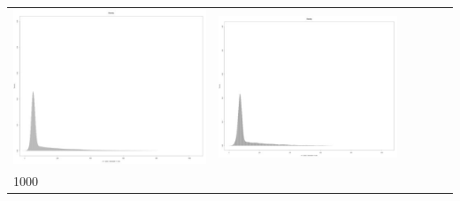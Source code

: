 \begin{table}[htbp]
{\begin{tabular}{l | ccccc}
\begin{minipage}{.15\textwidth}
     			 	\includegraphics[width=\linewidth]{images/mema-dens-graph/N7}
    				 \end{minipage}
    			   &	 \begin{minipage}{.15\textwidth}
     			 	\includegraphics[width=\linewidth]{images/mema-dens-graph/N10}
    				 \end{minipage}\\	
		1000   &	 \begin{minipage}{.15\textwidth}

\end{minipage}
\end{tabular}}
\end{table}
